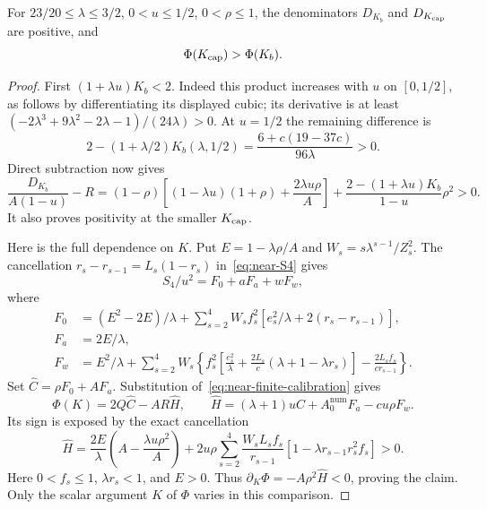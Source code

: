\begin{lemma}\label{lem:near-K-affinity}
For $23/20\le\lambda\le3/2$, $0<u\le1/2$, $0<\rho\le1$, the denominators $D_{K_b}$ and $D_{K_{\rm cap}}$ are positive, and
\[
 \Phi(K_{\rm cap})>\Phi(K_b).
\]
\end{lemma}
\begin{proof}
First $(1+\lambda u)K_b<2$. Indeed this product increases with $u$ on $[0,1/2]$, as follows by differentiating its displayed cubic; its derivative is at least $(-2\lambda^3+9\lambda^2-2\lambda-1)/(24\lambda)>0$. At $u=1/2$ the remaining difference is
\[
 2-(1+\lambda/2)K_b(\lambda,1/2)
 =\frac{6+c(19-37c)}{96\lambda}>0.
\]
Direct subtraction now gives
\begin{equation}\label{eq:near-positive-D}
 \frac{D_{K_b}}{A(1-u)}-R
 =(1-\rho)\left[(1-\lambda u)(1+\rho)+\frac{2\lambda u\rho}{A}\right]
 +\frac{2-(1+\lambda u)K_b}{1-u}\rho^2>0.
\end{equation}
It also proves positivity at the smaller $K_{\rm cap}$.

Here is the full dependence on $K$. Put $E=1-\lambda\rho/A$ and $W_s=s\lambda^{s-1}/Z_s^2$. The cancellation
$r_s-r_{s-1}=L_s(1-r_s)$ in~\eqref{eq:near-S4} gives
\[
 S_4/u^2=F_0+aF_a+wF_w,
\]
where
\[
\begin{split}
 F_0&=(E^2-2E)/\lambda+
       \sum_{s=2}^4W_sf_s^2[e_s^2/\lambda+2(r_s-r_{s-1})],\\
 F_a&=2E/\lambda,\\
 F_w&=E^2/\lambda+
 \sum_{s=2}^4W_s\left\{f_s^2\left[\frac{e_s^2}{\lambda}
       +\frac{2L_s}{c}(\lambda+1-\lambda r_s)\right]
       -\frac{2L_sf_s}{cr_{s-1}}\right\}.
\end{split}
\]
Set $\widehat C=\rho F_0+AF_a$. Substitution of~\eqref{eq:near-finite-calibration} gives
\[
 \Phi(K)=2Q\widehat C-AR\widehat H,
 \qquad \widehat H=(\lambda+1)u\widehat C+A_0^\mathrm{num}F_a-cu\rho F_w.
\]
Its sign is exposed by the exact cancellation
\[
 \widehat H=\frac{2E}{\lambda}\left(A-\frac{\lambda u\rho^2}{A}\right)
 +2u\rho\sum_{s=2}^4\frac{W_sL_sf_s}{r_{s-1}}
          [1-\lambda r_{s-1}r_s^2f_s]>0.
\]
Here $0<f_s\le1$, $\lambda r_s<1$, and $E>0$. Thus
$\partial_K\Phi=-A\rho^2\widehat H<0$, proving the claim. Only the scalar argument $K$ of $\Phi$ varies in this comparison.
\end{proof}

